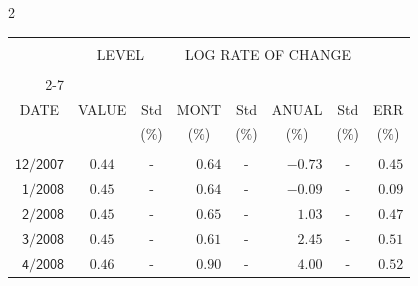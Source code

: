 \begin{multicols}{2}{ 
\begin{tabular}{rccrcrcr} 
\hline 
 \multicolumn{1}{|c|}{}  &  \multicolumn{2}{c|}{} & 
\multicolumn{4}{c}{} & \multicolumn{1}{|c|}{}\vspace{-.10in}\\ 
\multicolumn{1}{|c|}{}  &  \multicolumn{2}{c|}{LEVEL} & 
\multicolumn{4}{c}{LOG RATE OF CHANGE} & \multicolumn{1}{|c|}{}    \\  
\multicolumn{1}{|c|}{}  &  \multicolumn{2}{c|}{} & 
\multicolumn{4}{c}{} & \multicolumn{1}{|c|}{}\vspace{-.10in}\\ \cline{2-7} 
\multicolumn{1}{|c|}{ } &\multicolumn{1}{c|}{ } & \multicolumn{1}{c|}{} & \multicolumn{1}{c|}{} & \multicolumn{1}{c|}{}     & \multicolumn{1}{c|}{} & \multicolumn{1}{c|}{}  & \multicolumn{1}{c|}{}  \vspace{-.05in}\\  
\multicolumn{1}{|c|}{DATE } &\multicolumn{1}{c|}{ VALUE} & \multicolumn{1}{c|}{Std} & \multicolumn{1}{c|}{MONT} & \multicolumn{1}{c|}{Std}     & \multicolumn{1}{c|}{ANUAL} & \multicolumn{1}{c|}{Std}  & \multicolumn{1}{c|}{ERR}\\  
\multicolumn{1}{|c|}{ }      & \multicolumn{1}{c|}{  }    & \multicolumn{1}{c|}{($\%$)}&  \multicolumn{1}{c|}{($\%$)  }  & \multicolumn{1}{c|}{($\%$)} & \multicolumn{1}{c|}{($\%$) }     & \multicolumn{1}{c|}{ ($\%$) }  &  \multicolumn{1}{c|}{ ($\%$) } \\  
 \hline 
 \\$\mathsf{      12/2007}$ &$\mathsf{     0.44}$ &     - &$\mathsf{    0.64}$ &     - &$\mathsf{    -0.73 }$ &     - &$\mathsf{   0.45} $ \vspace{-.005in}\\ 
$\mathsf{       1/2008}$ &$\mathsf{     0.45}$ &     - &$\mathsf{    0.64}$ &     - &$\mathsf{    -0.09 }$ &     - &$\mathsf{   0.09} $ \vspace{-.005in}\\ 
$\mathsf{       2/2008}$ &$\mathsf{     0.45}$ &     - &$\mathsf{    0.65}$ &     - &$\mathsf{     1.03 }$ &     - &$\mathsf{   0.47} $ \vspace{-.005in}\\ 
$\mathsf{       3/2008}$ &$\mathsf{     0.45}$ &     - &$\mathsf{    0.61}$ &     - &$\mathsf{     2.45 }$ &     - &$\mathsf{   0.51} $ \vspace{-.005in}\\ 
$\mathsf{       4/2008}$ &$\mathsf{     0.46}$ &     - &$\mathsf{    0.90}$ &     - &$\mathsf{     4.00 }$ &     - &$\mathsf{   0.52} $ \vspace{-.005in}\\ 

\end{tabular}}
\end{multicols}
